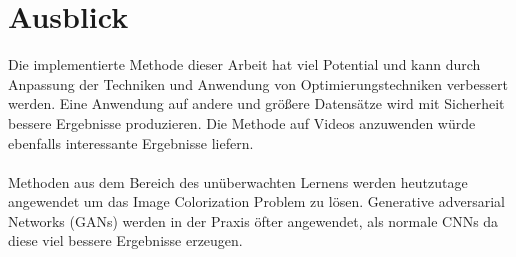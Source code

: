 \section{Ausblick}
Die implementierte Methode dieser Arbeit hat viel Potential und kann durch Anpassung der Techniken und Anwendung von Optimierungstechniken
verbessert werden. Eine Anwendung auf andere und größere Datensätze wird mit Sicherheit bessere Ergebnisse produzieren. Die Methode auf Videos
anzuwenden würde ebenfalls interessante Ergebnisse liefern.
\\
\\
Methoden aus dem Bereich des unüberwachten Lernens werden heutzutage angewendet um das Image Colorization Problem zu lösen. Generative adversarial
Networks (GANs) werden in der Praxis öfter angewendet, als normale \gls{CNN}s da diese viel bessere Ergebnisse erzeugen.